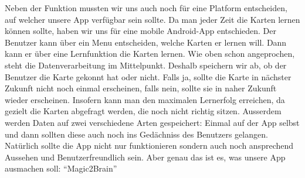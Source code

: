 Neben der Funktion mussten wir uns auch noch für eine Platform entscheiden, auf welcher unsere App verfügbar sein sollte. Da man jeder Zeit die Karten lernen können sollte, haben wir uns für eine mobile Android-App entschieden. Der Benutzer kann über ein Menu entscheiden, welche Karten er lernen will. Dann kann er über eine Lernfunktion die Karten lernen. Wie oben schon angeprochen, steht die Datenverarbeitung im Mittelpunkt. Deshalb speichern wir ab, ob der Benutzer die Karte gekonnt hat oder nicht. Falls ja, sollte die Karte in nächster Zukunft nicht noch einmal erscheinen, falls nein, sollte sie in naher Zukunft wieder erscheinen. Insofern kann man den maximalen Lernerfolg erreichen, da gezielt die Karten abgefragt werden, die noch nicht richtig sitzen. Ausserdem werden Daten auf zwei verschiedene Arten gespeichert: Einmal auf der App selbst und dann sollten diese auch noch ins Gedächniss des Benutzers gelangen. Natürlich sollte die App nicht nur funktionieren sondern auch noch ansprechend Aussehen und Benutzerfreundlich sein. Aber genau das ist es, was unsere App ausmachen soll: "`Magic2Brain"'